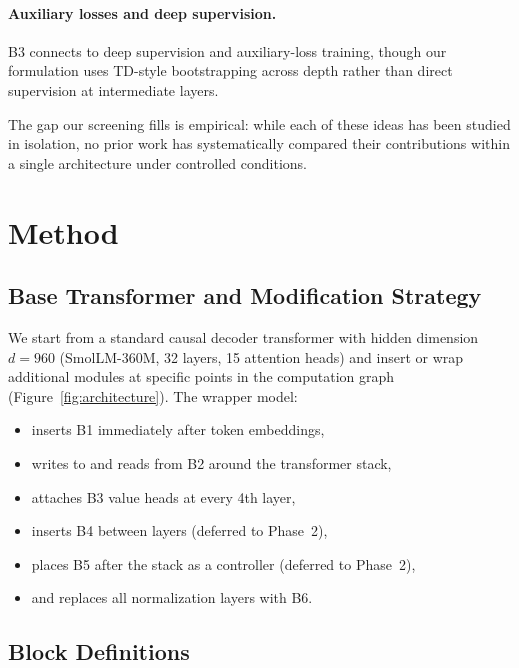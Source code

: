 \documentclass[11pt]{article}
\begin{document}
\paragraph{Auxiliary losses and deep supervision.}
B3 connects to deep supervision \citep{lee2015deeply} and auxiliary-loss
training, though our formulation uses TD-style bootstrapping across depth
rather than direct supervision at intermediate layers.

\medskip\noindent
The gap our screening fills is empirical: while each of these ideas has been
studied in isolation, no prior work has systematically compared their
contributions within a single architecture under controlled conditions.

\section{Method}
\label{sec:method}

\subsection{Base Transformer and Modification Strategy}

We start from a standard causal decoder transformer with hidden dimension
$d = 960$ (SmolLM-360M, 32 layers, 15 attention heads) and insert or wrap
additional modules at specific points in the computation graph
(Figure~\ref{fig:architecture}).
The wrapper model:
\begin{itemize}[leftmargin=1.5em]
  \item inserts B1 immediately after token embeddings,
  \item writes to and reads from B2 around the transformer stack,
  \item attaches B3 value heads at every 4th layer,
  \item inserts B4 between layers (deferred to Phase~2),
  \item places B5 after the stack as a controller (deferred to Phase~2),
  \item and replaces all normalization layers with B6.
\end{itemize}

\subsection{Block Definitions}
\end{document}
